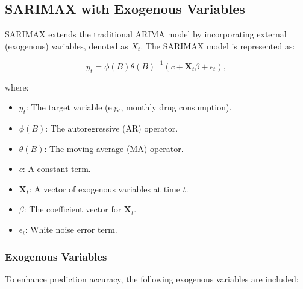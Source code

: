 \documentclass[journal]{IEEEtran}
\begin{document}
\subsection{SARIMAX with Exogenous Variables}
SARIMAX extends the traditional ARIMA model by incorporating external (exogenous) variables, denoted as \(X_{t}\). The SARIMAX model is represented as:

\begin{equation}
y_{t}=\phi(B)\theta(B)^{-1}\left(c+\mathbf{X}_{t}\beta+\epsilon_{t}\right),
\end{equation}

where:
\begin{itemize}
    \item \(y_{t}\): The target variable (e.g., monthly drug consumption).
    \item \(\phi(B)\): The autoregressive (AR) operator.
    \item \(\theta(B)\): The moving average (MA) operator.
    \item \(c\): A constant term.
    \item \(\mathbf{X}_{t}\): A vector of exogenous variables at time \(t\).
    \item \(\beta\): The coefficient vector for \(\mathbf{X}_{t}\).
    \item \(\epsilon_{i}\): White noise error term.
\end{itemize}

\subsubsection{Exogenous Variables}
To enhance prediction accuracy, the following exogenous variables are included:
\end{document}
